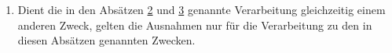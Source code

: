 \begin{enumerate}
  \item Dient die in den Absätzen \hyperref[itm:89-2]{2} und \hyperref[ch:89-3]{3} genannte Verarbeitung gleichzeitig
   einem anderen Zweck, gelten die Ausnahmen nur für die Verarbeitung zu den in diesen Absätzen genannten Zwecken.
  \label{itm:89-4}

\end{enumerate}


